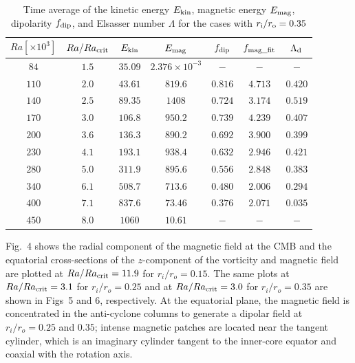  \begin{table}
\caption{Time average of the kinetic energy $E_{\rm kin}$, magnetic energy $E_{\rm mag}$, dipolarity $f_{\rm dip}$, and Elsasser number $\Lambda$ for the cases with $r_{\rm i}/r_{\rm o} = 0.35$}
  \begin{tabular}{ccccccc}
    \hline
     $Ra[\times 10^3]$  &  $Ra/Ra_{\rm crit}$&  $E_{\rm kin}$  &  $E_{\rm mag}$ & $f_{\rm dip}$ & $f_{\rm mag\_fit}$ & $\Lambda_{\rm d}$\\
    \hline \hline
      $84$    & $1.5$ &  $35.09$ & $2.376 \times 10^{-3}$ & $-$ & $-$ & $-$\\
     $110$  & $2.0$ &  $43.61$ & $819.6$ & $0.816$ & $4.713$ & $0.420$\\
     $140$  & $2.5$ &  $89.35$ & $1408$ & $0.724$ & $3.174$ & $0.519$\\
     $170$  & $3.0$ &  $106.8$ & $950.2$ & $0.739$ & $4.239$ & $0.407$\\
     $200$  & $3.6$ &  $136.3$ & $890.2$ & $0.692$ & $3.900$ & $0.399$\\
     $230$  & $4.1$ &  $193.1$ & $938.4$ & $0.632$ & $2.946$ & $0.421$\\
     $280$  & $5.0$ &  $311.9$ & $895.6$ & $0.556$ & $2.848$ & $0.383$\\
     $340$  & $6.1$ &  $508.7$ & $713.6$ & $0.480$ & $2.006$ & $0.294$\\
     $400$  & $7.1$ &  $837.6$ & $73.46$ & $0.376$ & $2.071$ & $0.035$\\
     $450$  & $8.0$ &  $1060$ & $10.61$ & $-$ & $-$ & $-$\\
    \hline
  \end{tabular}
\label{table:Summary_35}
 \end{table}
%
Fig.~4 shows the radial component of the magnetic field at the CMB and the equatorial cross-sections of the $z$-component of the vorticity and magnetic field are plotted at $Ra/Ra_{\rm crit} = 11.9$ for $r_i/r_o = 0.15$. 
The same plots at $Ra/Ra_{\rm crit} = 3.1$ for $r_i/r_o = 0.25$ and at $Ra/Ra_{\rm crit} = 3.0$ for $r_i/r_o = 0.35$ are shown in Figs~5 and 6, respectively. 
At the equatorial plane, the magnetic field is concentrated in the anti-cyclone columns to generate a dipolar field at $r_i/r_o = 0.25$ and $0.35$; intense magnetic patches are located near the tangent cylinder, which is an imaginary cylinder tangent to the inner-core equator and coaxial with the rotation axis. 
